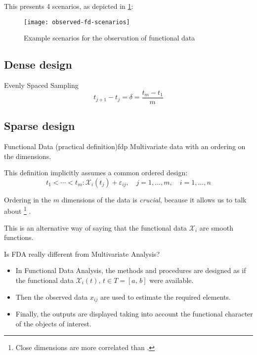 This presents 4 scenarios, as depicted in \cref{fig:observed-fd-scenarios}:
\begin{figure}[H]
	\texttt{[image: observed-fd-scenarios]}
	\caption{Example scenarios for the observation of functional data}
	\label{fig:observed-fd-scenarios}
\end{figure}

\subsection{Dense design}

\begin{definition}{Evenly Spaced Sampling}{}
	\begin{equation*}
		t_{j+1} - t_j = \delta = \frac{t_m - t_1}{m}
	\end{equation*}
\end{definition}

\subsection{Sparse design}


\begin{definition}{Functional Data (practical definition)}{fdp}
	Multivariate data with an ordering on the dimensions.

	This definition implicitly assumes a common ordered design:
	\begin{equation*}
		t_1 < \cdots < t_m :  \mathcal X_i (t_j) + \varepsilon_{ij},\quad
		j=1,\ldots,m,\quad i=1,\ldots,n
	\end{equation*}
	\tcblower
	\begin{note}
		Ordering in the $m$ dimensions of the data is \emph{crucial},
		because it allows us to talk about %
		\footnote{Close dimensions are more correlated than .}%
		.
	\end{note}
	\begin{note}
		This is an alternative way of saying that the functional data
		$\mathcal X_i$ are smooth functions.
	\end{note}
\end{definition}

\begin{question*}
	{Is FDA really different from Multivariate Analysis?}
	\begin{itemize}
		\item In Functional Data Analysis, the methods and procedures are
		      designed as if the functional data $\mathcal X_i(t),\,t\in T=[a,\,b]$
		      were available.
		\item Then the observed data $x_{ij}$ are used to estimate the required
		      elements.
		\item Finally, the outputs are displayed taking into account the functional
		      character of the objects of interest.
	\end{itemize}
\end{question*}




